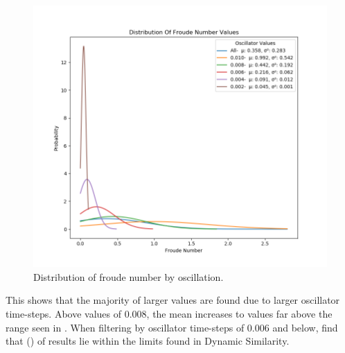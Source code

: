 \begin{figure}[h!]
    \centering
\includegraphics[width=1\textwidth]{USFD_Academic-_Report_LaTeX-Template/figures/froudedistributionoscillator.png}
\caption{Distribution of froude number by oscillation.}
\label{froudedosc}
\end{figure}

This shows that the majority of larger values are found due to larger oscillator time-steps. Above values of 0.008, the mean increases to values far above the range seen in \cite{Alexander1983}. When filtering by oscillator time-steps of 0.006 and below, find that () of results lie within the limits found in Dynamic Similarity. 





